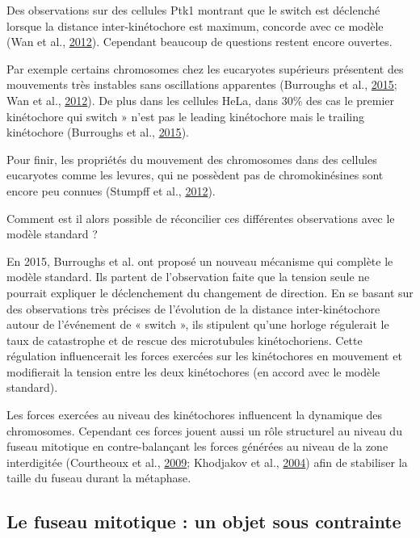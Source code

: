 \documentclass[12pt,a4paper,twoside,openright]{book}
\begin{document}
Des observations sur des cellules Ptk1 montrant que le switch est
déclenché lorsque la distance inter-kinétochore est maximum, concorde
avec ce modèle (Wan et al., \hyperref[ref-Wan2012]{2012}). Cependant
beaucoup de questions restent encore ouvertes.

Par exemple certains chromosomes chez les eucaryotes supérieurs
présentent des mouvements très instables sans oscillations apparentes
(Burroughs et al., \hyperref[ref-Burroughs2015]{2015}; Wan et al.,
\hyperref[ref-Wan2012]{2012}). De plus dans les cellules HeLa, dans 30\%
des cas le premier kinétochore qui switch » n'est pas le leading
kinétochore mais le trailing kinétochore (Burroughs et al.,
\hyperref[ref-Burroughs2015]{2015}).

Pour finir, les propriétés du mouvement des chromosomes dans des
cellules eucaryotes comme les levures, qui ne possèdent pas de
chromokinésines sont encore peu connues (Stumpff et al.,
\hyperref[ref-Stumpff2012]{2012}).

Comment est il alors possible de réconcilier ces différentes
observations avec le modèle standard ?

En 2015, Burroughs et al. ont proposé un nouveau mécanisme qui complète
le modèle standard. Ils partent de l'observation faite que la tension
seule ne pourrait expliquer le déclenchement du changement de direction.
En se basant sur des observations très précises de l'évolution de la
distance inter-kinétochore autour de l'événement de « switch », ils
stipulent qu'une horloge régulerait le taux de catastrophe et de rescue
des microtubules kinétochoriens. Cette régulation influencerait les
forces exercées sur les kinétochores en mouvement et modifierait la
tension entre les deux kinétochores (en accord avec le modèle standard).

Les forces exercées au niveau des kinétochores influencent la dynamique
des chromosomes. Cependant ces forces jouent aussi un rôle structurel au
niveau du fuseau mitotique en contre-balançant les forces générées au
niveau de la zone interdigitée (Courtheoux et al.,
\hyperref[ref-Courtheoux2009]{2009}; Khodjakov et al.,
\hyperref[ref-Khodjakov2004]{2004}) afin de stabiliser la taille du
fuseau durant la métaphase.

\subsection{Le fuseau mitotique : un objet sous
contrainte}\label{le-fuseau-mitotique-un-objet-sous-contrainte}
\end{document}
